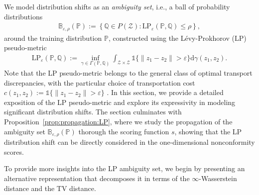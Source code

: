 \documentclass[11pt,a4paper]{article}
\begin{document}
We model distribution shifts as an \emph{ambiguity set}, i.e., a ball of probability distributions
\begin{align}
\label{eq:LP:ambiguity:set}
    \mathbb B_{\varepsilon,\rho}(\mathbb P) :=\left\{\mathbb Q\in P(\mathcal{Z}): \text{LP}_\varepsilon(\mathbb P, \mathbb Q)\leq \rho\right\},
\end{align}
around the training distribution $\mathbb P$, constructed using the Lévy-Prokhorov (LP) pseudo-metric
\begin{align}
\label{eq:LP:distance}
    \text{LP}_{\varepsilon}(\mathbb P, \mathbb Q) := \inf_{\gamma\in\Gamma(\mathbb P,\mathbb Q)}\int_{\mathcal Z \times \mathcal Z} \mathds{1}\{\|z_1-z_2\|>\varepsilon\}\mathrm{d}\gamma(z_1,z_2).
\end{align}
Note that the LP pseudo-metric belongs to the general class of optimal transport discrepancies, with the particular choice of transportation cost $c(z_1,z_2) := \mathds{1}\{\|z_1-z_2\|>\varepsilon\}$ \cite{Bennouna_2023}. In this section, we provide a detailed exposition of the LP pseudo-metric and explore its expressivity in modeling significant distribution shifts. The section culminates with Proposition~\ref{prop:propagation:LP}, where we study the propagation of the ambiguity set $\mathbb B_{\varepsilon,\rho}(\mathbb P)$ thorough the scoring function $s$, showing that the LP distribution shift can be directly considered in the one-dimensional nonconformity scores.

To provide more insights into the LP ambiguity set, we begin by presenting an alternative representation that decomposes it in terms of the $\infty$-Wasserstein distance and the TV distance.
\end{document}
